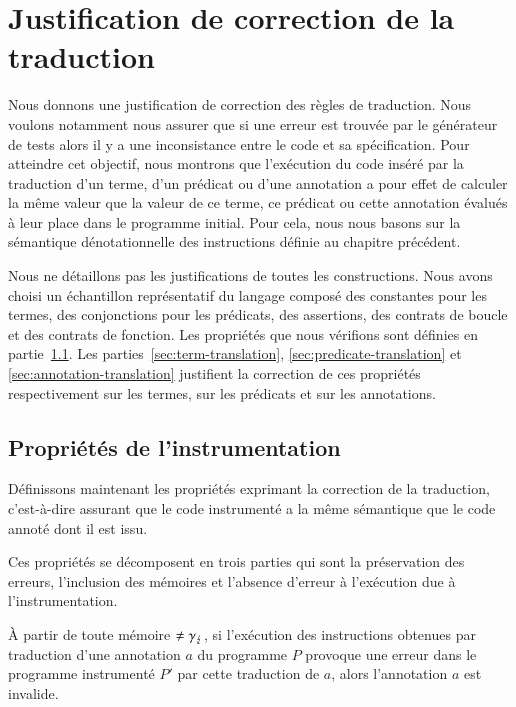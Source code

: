 \section{Justification de correction de la traduction}
\label{sec:justif}


Nous donnons une justification de correction des règles de traduction.
Nous voulons notamment nous assurer que si une erreur est trouvée par le
générateur de tests alors il y a une inconsistance entre le code et sa
spécification.
Pour atteindre cet objectif, nous montrons que l'exécution du code inséré par
la traduction d'un terme, d'un prédicat ou d'une annotation a pour effet de
calculer la même valeur que la valeur de ce terme, ce prédicat ou cette
annotation évalués à leur place dans le programme initial.
Pour cela, nous nous basons sur la sémantique dénotationnelle des instructions
définie au chapitre précédent.

Nous ne détaillons pas les justifications de toutes les constructions.
Nous avons choisi un échantillon représentatif du langage composé des constantes
pour les termes, des conjonctions pour les prédicats, des assertions, des
contrats de boucle et des contrats de fonction.
Les propriétés que nous vérifions sont définies en partie~\ref{sec:properties}.
Les parties~\ref{sec:term-translation}, \ref{sec:predicate-translation} et
\ref{sec:annotation-translation} justifient la correction de ces propriétés
respectivement sur les termes, sur les prédicats et sur les annotations.


\subsection{Propriétés de l'instrumentation}
\label{sec:properties}


Définissons maintenant les propriétés exprimant la correction de la traduction,
c'est-à-dire assurant que le code instrumenté a la même sémantique que le code
annoté dont il est issu.

Ces propriétés se décomposent en trois parties qui sont la préservation des
erreurs, l'inclusion des mémoires et l'absence d'erreur à l'exécution due à
l'instrumentation.

\begin{myproperty}
  \label{th:error}
  À partir de toute mémoire $\neq \gamma_\lightning$, si l'exécution des instructions
  obtenues par traduction d'une annotation $a$ du programme $P$ provoque une
  erreur dans le programme instrumenté $P'$ par cette traduction de $a$, alors
  l'annotation $a$ est invalide.
\end{myproperty}

